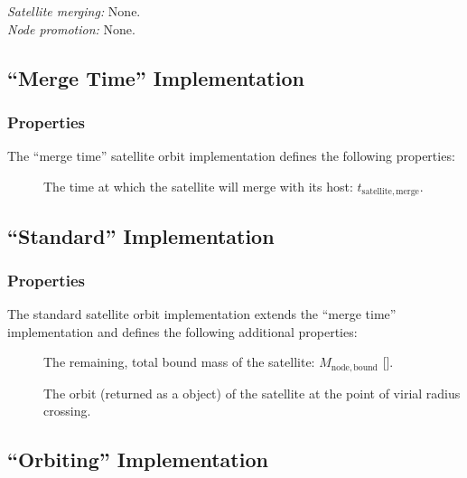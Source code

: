 \noindent\emph{Satellite merging:} None.\\

\noindent\emph{Node promotion:} None.\\

\subsection{``Merge Time'' Implementation}

\subsubsection{Properties}

The ``merge time'' satellite orbit implementation defines the following properties:
\begin{description}
 \item [] The time at which the satellite will merge with its host: $t_\mathrm{satellite, merge}$.
\end{description}

\subsection{``Standard'' Implementation}

\subsubsection{Properties}

The standard satellite orbit implementation extends the ``merge time'' implementation and defines the following additional properties:
\begin{description}
 \item [] The remaining, total bound mass of the satellite: $M_\mathrm{node,bound}$ [].
 \item[] The orbit (returned as a \href{https://github.com/galacticusorg/galacticus/releases/download/bleeding-edge/Galacticus_Development.pdf\#sec.KeplerOrbits} object) of the satellite at the point of virial radius crossing.
\end{description}

\subsection{``Orbiting'' Implementation}\label{sec:ComponentSatelliteOrbiting}

